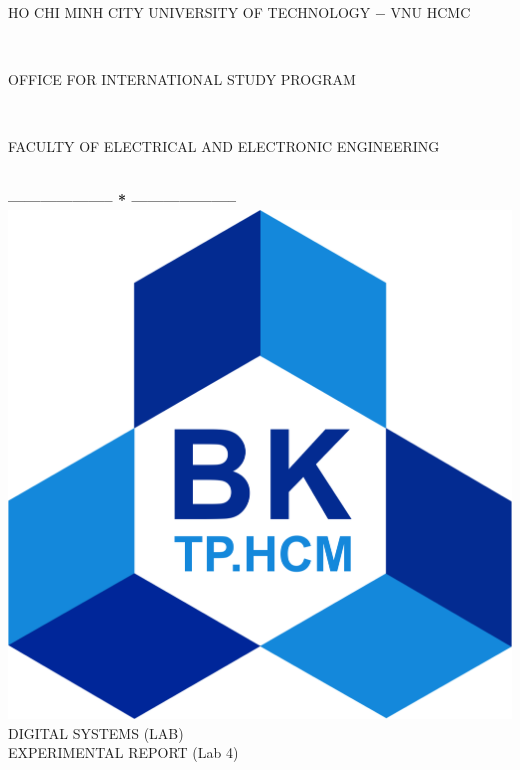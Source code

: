 \documentclass[13pt,a4paper]{report}
\begin{document}
\fontsize{13pt}{18pt}\selectfont
\begin{titlepage}
\thispagestyle{empty}
\thisfancypage{%
\setlength{\fboxsep}{0pt}%
\fbox}{} %
\

\begin{center}
\begin{large}
HO CHI MINH CITY UNIVERSITY OF TECHNOLOGY $-$ VNU HCMC
\end{large} \\
\begin{large}
OFFICE FOR INTERNATIONAL STUDY PROGRAM
\end{large} \\
\begin{large}
FACULTY OF ELECTRICAL AND ELECTRONIC ENGINEERING
\end{large} \\
\textbf{--------------------  *  --------------------}\\[4cm]
\includegraphics[scale=0.1]{logobk.png}\\[1cm]
{\fontsize{20pt}{1}\selectfont DIGITAL SYSTEMS (LAB)}\\
{\fontsize{20pt}{1}\selectfont EXPERIMENTAL REPORT (Lab 4)}\\[2.5cm]
\end{center}


\end{titlepage}
\end{document}
